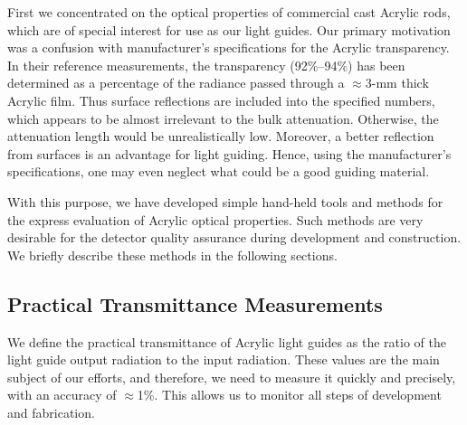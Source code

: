 First we concentrated on the optical properties of commercial cast Acrylic 
rods, which are of special interest for use as our light guides.  Our primary 
motivation was a confusion with manufacturer's specifications for the Acrylic 
transparency.  In their reference measurements, the transparency (92\%--94\%) 
has been determined as a percentage of the radiance passed through a $\approx$3-mm 
thick Acrylic film.  Thus surface reflections are included into the specified 
numbers, which appears to be almost irrelevant to the bulk attenuation. 
Otherwise, the attenuation length would be unrealistically low.  Moreover, a 
better reflection from surfaces is an advantage for light guiding.  Hence, using 
the manufacturer's specifications, one may even neglect what could be a good 
guiding material. 

With this purpose, we have developed simple hand-held tools and methods for 
the express evaluation of Acrylic optical properties.  Such methods are very 
desirable for the detector quality assurance during development and construction.  
We briefly describe these methods in the following sections.

\subsection{Practical Transmittance Measurements}
\label{PTM}

We define the practical transmittance of Acrylic light guides as the ratio of 
the light guide output radiation to the input radiation.  These values are 
the main subject of our efforts, and therefore, we need to measure it quickly 
and precisely, with an accuracy of $\approx$1\%.  This allows us to monitor 
all steps of development and fabrication.
 
